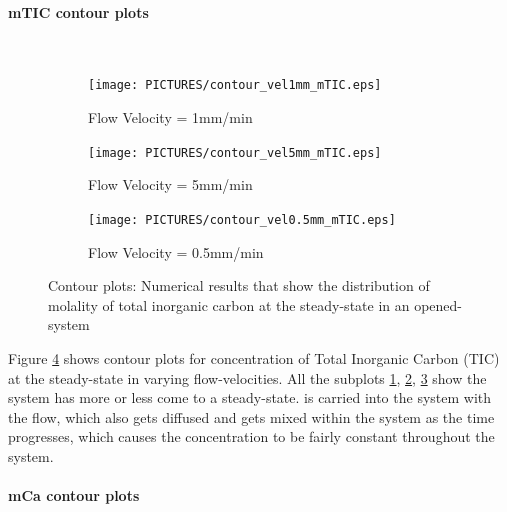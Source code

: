 \paragraph*{mTIC contour plots} \mbox{}\\
\begin{figure}[!h]
\centering
    \begin{subfigure}{.5\linewidth}
        \centering
        \texttt{[image: PICTURES/contour\_vel1mm\_mTIC.eps]}
        \caption{Flow Velocity = 1mm/min}
        \label{fig:TICSteady-state}       %
    \end{subfigure}%
    \hfill
    \begin{subfigure}{.5\linewidth}
        \centering
        \texttt{[image: PICTURES/contour\_vel5mm\_mTIC.eps]}
        \caption{Flow Velocity = 5mm/min}
        \label{fig:TICSteady-state5mm}       %
    \end{subfigure}%
    \hfill
    \begin{subfigure}{.5\linewidth}
        \centering
        \texttt{[image: PICTURES/contour\_vel0.5mm\_mTIC.eps]}
        \caption{Flow Velocity = 0.5mm/min}
        \label{fig:TICSteady-state0.5mm}       %
    \end{subfigure}%
    \caption{\DuMuX Contour plots: Numerical results that show the distribution of molality of total inorganic carbon at the steady-state in an opened-system}
     \label{fig:contourTIC}
\end{figure}

Figure \ref{fig:contourTIC} shows contour plots for concentration of Total Inorganic Carbon (TIC) at the steady-state in varying flow-velocities. All the subplots \ref{fig:TICSteady-state}, \ref{fig:TICSteady-state5mm}, \ref{fig:TICSteady-state0.5mm} show the system has more or less come to a steady-state.  is carried into the system with the flow, which also gets diffused and gets mixed within the system as the time progresses, which causes the concentration to be fairly constant throughout the system. 


\paragraph*{mCa contour plots} \mbox{}\\

